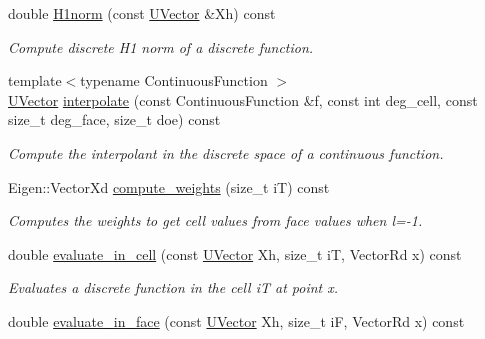 \begin{DoxyCompactItemize}
double \hyperlink{classHArDCore3D_1_1HybridCore_ad6672e0691764ec5752eb1a9a7257792}{H1norm} (const \hyperlink{classHArDCore3D_1_1UVector}{U\+Vector} \&Xh) const
\begin{DoxyCompactList}\small\item\em Compute discrete H1 norm of a discrete function. \end{DoxyCompactList}\item 
{\footnotesize template$<$typename Continuous\+Function $>$ }\\\hyperlink{classHArDCore3D_1_1UVector}{U\+Vector} \hyperlink{group__HybridCore_gadce852531f9197a35e11e1bf9995e827}{interpolate} (const Continuous\+Function \&f, const int deg\+\_\+cell, const size\+\_\+t deg\+\_\+face, size\+\_\+t doe) const
\begin{DoxyCompactList}\small\item\em Compute the interpolant in the discrete space of a continuous function. \end{DoxyCompactList}\item 
\mbox{\label{classHArDCore3D_1_1HybridCore_a06825c5d156026d465a2798389aa952b}} 
Eigen\+::\+Vector\+Xd \hyperlink{classHArDCore3D_1_1HybridCore_a06825c5d156026d465a2798389aa952b}{compute\+\_\+weights} (size\+\_\+t iT) const
\begin{DoxyCompactList}\small\item\em Computes the weights to get cell values from face values when l=-\/1. \end{DoxyCompactList}\item 
\mbox{\label{classHArDCore3D_1_1HybridCore_a9c76abf42a1d56fbf863d8258690497c}} 
double \hyperlink{classHArDCore3D_1_1HybridCore_a9c76abf42a1d56fbf863d8258690497c}{evaluate\+\_\+in\+\_\+cell} (const \hyperlink{classHArDCore3D_1_1UVector}{U\+Vector} Xh, size\+\_\+t iT, Vector\+Rd x) const
\begin{DoxyCompactList}\small\item\em Evaluates a discrete function in the cell iT at point x. \end{DoxyCompactList}\item 
\mbox{\label{classHArDCore3D_1_1HybridCore_a088adb7dbbde4b63229b404ee72ed9ea}} 
double \hyperlink{classHArDCore3D_1_1HybridCore_a088adb7dbbde4b63229b404ee72ed9ea}{evaluate\+\_\+in\+\_\+face} (const \hyperlink{classHArDCore3D_1_1UVector}{U\+Vector} Xh, size\+\_\+t iF, Vector\+Rd x) const

\end{DoxyCompactItemize}

